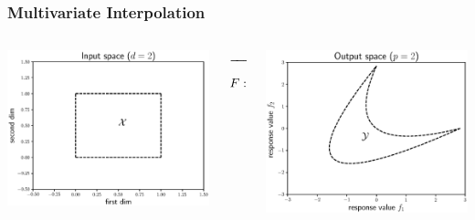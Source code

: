 \documentclass[aspectratio=169]{beamer}
\begin{document}
\begin{frame}\frametitle{Multivariate Interpolation}
\begin{columns}
\begin{column}{.35\textwidth}
\includegraphics[width=\textwidth]{feasible_design.eps}
\end{column}
\begin{column}{.2\textwidth}
\begin{center}
$\xrightarrow{\hspace*{2cm}}$
$$
F : {\cal X} \rightarrow {\cal Y}
$$
\end{center}
\end{column}
\begin{column}{.35\textwidth}
\includegraphics[width=\textwidth]{convex_pareto.eps}
\end{column}
\end{columns}
\bigskip
\bigskip
\bigskip
\end{frame}
\end{document}
